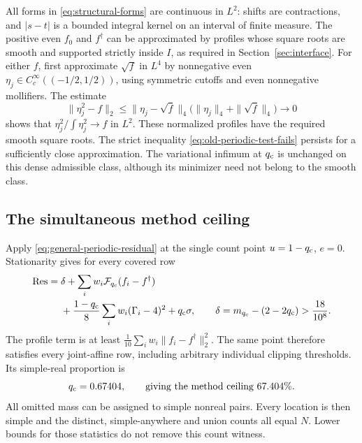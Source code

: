 \documentclass[11pt,reqno]{amsart}
\numberwithin{equation}{section}
\begin{document}
All forms in \eqref{eq:structural-forms} are continuous in $L^2$:
shifts are contractions, and $|s-t|$ is a bounded integral
kernel on an interval of finite measure.
The positive even $f_0$ and $f^\dagger$ can be approximated by
profiles whose square roots are smooth and supported strictly
inside $I$, as required in Section~\ref{sec:interface}.
For either $f$, first approximate $\sqrt f$ in $L^4$ by
nonnegative even $\eta_j\in C_c^\infty((-1/2,1/2))$, using
symmetric cutoffs and even nonnegative mollifiers. The estimate
\[
 \|\eta_j^2-f\|_2
 \le\|\eta_j-\sqrt f\|_4
       \bigl(\|\eta_j\|_4+\|\sqrt f\|_4\bigr)
 \longrightarrow0
\]
shows that $\eta_j^2/\int\eta_j^2\to f$ in $L^2$.
These normalized profiles have the required smooth square roots.
The strict inequality \eqref{eq:old-periodic-test-fails} persists
for a sufficiently close approximation. The variational infimum
at $q_{\rm c}$ is unchanged on this dense admissible class,
although its minimizer need not belong to the smooth class.

\subsection{The simultaneous method ceiling}

Apply \eqref{eq:general-periodic-residual} at the single count point
$u=1-q_{\rm c}$, $e=0$. Stationarity gives for every covered row
\begin{equation}
 \begin{split}
 \operatorname{Res}={}&
 \delta+\sum_iw_i\mathcal F_{q_{\rm c}}(f_i-f^\dagger)\\
 &+\frac{1-q_{\rm c}}8\sum_iw_i(\Gamma_i-4)^2
       +q_{\rm c}\sigma,\qquad
 \delta=m_{q_{\rm c}}-(2-2q_{\rm c})>\frac{18}{10^8}.
 \end{split}
 \label{eq:twelve-joint-residual}
\end{equation}
The profile term is at least
$\frac1{10}\sum_iw_i\|f_i-f^\dagger\|_2^2$.
The same point therefore satisfies every joint-affine row,
including arbitrary individual clipping thresholds.
Its simple-real proportion is
\begin{equation}
 q_{\rm c}=0.67404,\qquad
 \text{giving the method ceiling }67.404\%.
 \label{eq:all-profile-method-ceiling}
\end{equation}
All omitted mass can be assigned to simple nonreal pairs.
Every location is then simple and the distinct, simple-anywhere
and union counts all equal $N$. Lower bounds for those statistics
do not remove this count witness.
\end{document}
